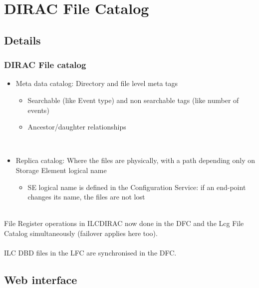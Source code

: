 \documentclass[10pt,table,dvipsnames]{beamer}
\begin{document}
\section{DIRAC File Catalog}
\label{sec:fc}

\subsection{Details}
\label{sec:fcdetails}

\begin{frame}
  \frametitle{DIRAC File catalog}
\begin{itemize}
\item Meta data catalog: {\color{NavyBlue}Directory and file level meta tags}
  \begin{itemize}
  \item Searchable (like Event type) and non searchable tags (like number of events)
  \item {\color{ForestGreen}Ancestor/daughter relationships}
  \end{itemize}
~\\
\item {\color{NavyBlue}Replica catalog}: Where the files are physically, with a path
  depending only on Storage Element logical name
  \begin{itemize}
  \item SE logical name is defined in the Configuration Service: {\color{ForestGreen}if an
    end-point changes its name, the files are not lost}
  \end{itemize}
\end{itemize}
~\\
File {\color{NavyBlue}Register operations} in ILCDIRAC now done {\color{NavyBlue}in the DFC and the Lcg File Catalog}
simultaneously (failover applies here too). \\
~\\
{\color{NavyBlue}ILC DBD files} in the LFC are synchronised in the DFC.
\end{frame}

\subsection{Web interface}
\label{sec:webfc}
\end{document}
